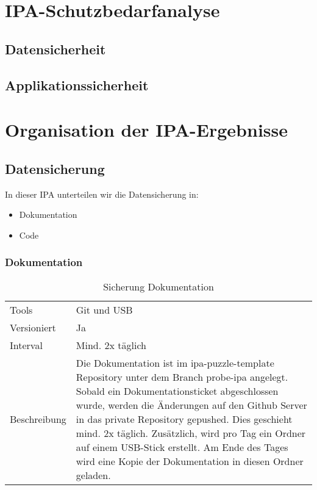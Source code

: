 \chapter{IPA-Schutzbedarfanalyse}

\section{Datensicherheit}

\section{Applikationssicherheit}

\chapter{Organisation der IPA-Ergebnisse}
\section{Datensicherung}
In dieser IPA unterteilen wir die Datensicherung in:

\begin{itemize}
\item Dokumentation
\item Code
\end{itemize}

\subsection{Dokumentation}
\begin{table}[h!]
    \begin{tabular}{|L{0.4\textwidth}|L{0.5\textwidth}|}
        \hline
          \\[12pt]
        \hline
        Tools & Git und USB \\
        \hline
        Versioniert & Ja \\
        \hline
        Interval & Mind. 2x täglich \\
        \hline
        Beschreibung & Die Dokumentation ist im ipa-puzzle-template Repository unter dem Branch probe-ipa angelegt.
        Sobald ein Dokumentationsticket abgeschlossen wurde, werden die Änderungen auf den Github Server in das private Repository
        gepushed. Dies geschieht mind. 2x täglich. Zusätzlich, wird pro Tag ein Ordner auf einem USB-Stick erstellt.  Am Ende des Tages wird eine Kopie der Dokumentation
        in diesen Ordner geladen. \\
      \hline
      \end{tabular}
      \caption{Sicherung Dokumentation}
\end{table}

